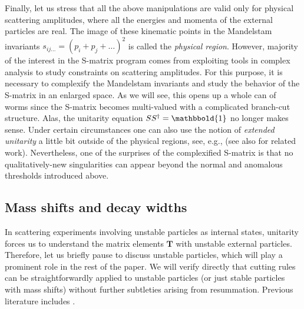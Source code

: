 \documentclass[12pt]{article}
\newcommand*{\boldone}{\mathbbold{1}}
\numberwithin{figure}{section}
\def \T {\mathbf{T}}
\begin{document}
	Finally, let us stress that all the above manipulations are valid only for physical scattering amplitudes, where all the energies and momenta of the external particles are real. The image of these kinematic points in the Mandelstam invariants $s_{ij\ldots} = (p_i + p_j + \ldots)^2$ is called the \emph{physical region}. However, majority of the interest in the S-matrix program comes from exploiting tools in complex analysis to study constraints on scattering amplitudes. For this purpose, it is necessary to complexify the Mandelstam invariants and study the behavior of the S-matrix in an enlarged space. As we will see, this opens up a whole can of worms since the S-matrix becomes multi-valued with a complicated branch-cut structure. Alas, the unitarity equation $SS^\dagger = \boldone$ no longer makes sense. Under certain circumstances one can also use the notion of \emph{extended unitarity} a little bit outside of the physical regions, see, e.g.,
	\cite{Olive1962b,Olive1963,Boyling1964,Homrich:2019cbt,Guerrieri:2020kcs,Correia:2021etg} (see also \cite{PhysRevLett.4.84,Goddard1969,doi:10.1063/1.1665233,doi:10.1063/1.1703897} for related work).
	Nevertheless, one of the surprises of the complexified S-matrix is that no qualitatively-new singularities can appear beyond the normal and anomalous thresholds introduced above. 
	
	\subsection{\label{sec:shifts-widths}Mass shifts and decay widths}
    
    In scattering experiments involving unstable particles as internal states, unitarity forces us to understand the matrix elements $\T$ with unstable external particles.
    Therefore, let us briefly pause to discuss unstable particles, which will play a prominent role in the rest of the paper. We will verify directly that cutting rules can be straightforwardly applied to unstable particles (or just stable particles with mass shifts) without further subtleties arising from resummation. Previous literature includes \cite{Veltman:1963th,Denner:2014zga,Donoghue:2019fcb}.
    
\end{document}
